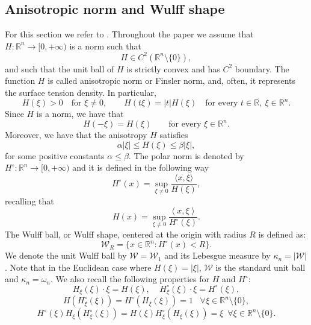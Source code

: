 \documentclass[oneside,a4paper,12pt,notitlepage]{article}
\theoremstyle{definition}
\newcommand{\R}{\mathbb{R}}
\begin{document}
\subsection{Anisotropic norm and Wulff shape}
For this section we refer to \cite{AFLT97,CWYY}.
Throughout the paper we assume that \(H:\mathbb R^n\to[0,+\infty)\) is a norm
such that
\[
H\in C^2(\mathbb R^n\setminus\{0\}),
\]
and such that the unit ball of \(H\) is strictly convex and has \(C^2\) boundary.
The function $H$ is called anisotropic norm or Finsler norm, and, often, it represents the surface tension density.  In particular,
\begin{equation}\label{eq:H_properties}
H(\xi)>0\quad\text{for }\xi\neq0,\qquad
H(t\xi)=|t|H(\xi)
\quad\text{for every }t\in\mathbb R,\ \xi\in\mathbb R^n.
\end{equation}
Since \(H\) is a norm, we have that 
\[
H(-\xi)=H(\xi)\qquad\text{for every }\xi\in\mathbb R^n.
\]
Moreover, we have that the anisotropy $H$ satisfies
\begin{equation} \label{control}
\alpha |\xi | \le H(\xi) \le \beta |\xi|,
\end{equation}
for some positive constants $\alpha \le \beta$. The polar norm is denoted by $H^\circ: \R^n \to [0, +\infty)$  and it is defined in the following way 
\begin{equation}
    H^\circ(x) = \sup_{\xi \neq 0} \frac{\langle x, \xi \rangle}{H(\xi)},
\end{equation}
 recalling that 
\begin{equation*}
H(x) = \sup_{\xi \neq 0 } \frac{\left< x , \xi \right>}{H^{\circ}(\xi)}.
\end{equation*}
The Wulff ball, or Wulff shape,  centered at the origin with radius $R$ is defined as:
\[
    \mathcal{W}_R = \{ x \in \R^n : H^\circ(x) < R \}.
\]
 We denote the unit Wulff ball by $\mathcal{W} = \mathcal{W}_1$ and its Lebesgue measure by $\kappa_n = |\mathcal{W}|$. Note that in the Euclidean case where $H(\xi)=|\xi|$, $\mathcal{W}$ is the standard unit ball and $\kappa_n = \omega_n$.
We also recall the following properties for $H$ and $H^{\circ}$:
\begin{equation} \label{prodsc}
H_{\xi}(\xi)\cdot \xi = H(\xi), \;\;\;\; H^{\circ}_{\xi}(\xi)\cdot \xi = H^{\circ}(\xi),
\end{equation} 
\begin{equation} \label{HHcirc}
H(H^{\circ}_{\xi}(\xi))= H^{\circ}(H_{\xi}(\xi))=1 \,\,\,\,\, \forall \xi \in \mathbb{R}^n \setminus \{0\},
\end{equation} 
\begin{equation}\label{Hcircxi}
H^{\circ}(\xi)H_{\xi}(H^{\circ}_{\xi}(\xi))=H(\xi)H^{\circ}_{\xi}(H_{\xi}(\xi)) = \xi \,\,\, \forall \xi \in \mathbb{R}^n \setminus \{0\}.
\end{equation}
\end{document}

